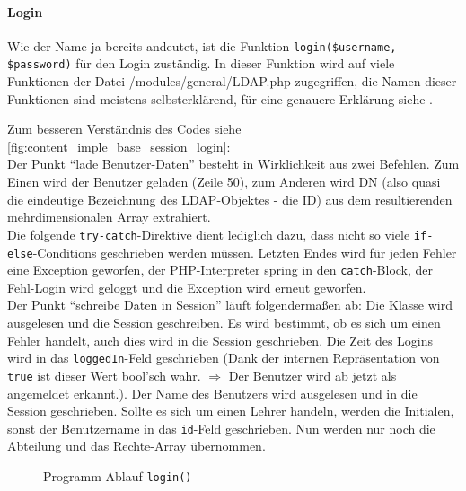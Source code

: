 \paragraph{Login\\}
Wie der Name ja bereits andeutet, ist die Funktion \texttt{login(\$username, \$password)} für den Login zuständig. In dieser Funktion wird auf viele Funktionen der Datei /modules/general/LDAP.php zugegriffen, die Namen dieser Funktionen sind meistens selbsterklärend, für eine genauere Erklärung siehe .

Zum besseren Verständnis des Codes siehe \autoref{fig:content_imple_base_session_login}:\\
Der Punkt \enquote{lade Benutzer-Daten} besteht in Wirklichkeit aus zwei Befehlen. Zum Einen wird der Benutzer geladen (Zeile 50), zum Anderen wird DN (also quasi die eindeutige Bezeichnung des LDAP-Objektes - die ID) aus dem resultierenden mehrdimensionalen Array extrahiert.\\
Die folgende \texttt{try-catch}-Direktive dient lediglich dazu, dass nicht so  viele \texttt{if-else}-Conditions geschrieben werden müssen. Letzten Endes wird für jeden Fehler eine Exception geworfen, der PHP-Interpreter spring in den \texttt{catch}-Block, der Fehl-Login wird geloggt und die Exception wird erneut geworfen.\\
Der Punkt \enquote{schreibe Daten in Session} läuft folgendermaßen ab: Die Klasse wird ausgelesen und die Session geschreiben. Es wird bestimmt, ob es sich um einen Fehler handelt, auch dies wird in die Session geschrieben. Die Zeit des Logins wird in das \texttt{loggedIn}-Feld geschrieben (Dank der internen Repräsentation von \texttt{true} ist dieser Wert bool'sch wahr. $ \Longrightarrow $ Der Benutzer wird ab jetzt als angemeldet erkannt.). Der Name des Benutzers wird ausgelesen und in die Session geschrieben. Sollte es sich um einen Lehrer handeln, werden die Initialen, sonst der Benutzername in das \texttt{id}-Feld geschrieben. Nun werden nur noch die Abteilung und das Rechte-Array übernommen.
\begin{figure}[H]
\centering
\caption{Programm-Ablauf \texttt{login()}}
\label{fig:content_imple_base_session_login}
\end{figure}


